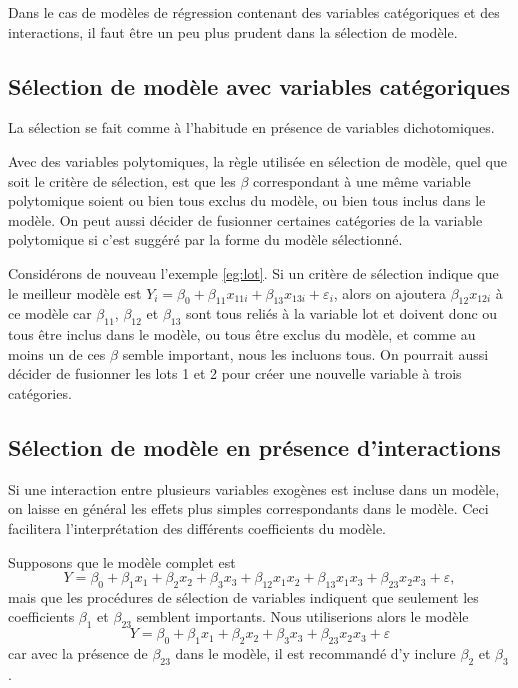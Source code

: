 Dans le cas de modèles de régression contenant des variables catégoriques et des interactions, il faut être un peu plus prudent dans la sélection de modèle.

\subsection{Sélection de modèle avec variables catégoriques}

La sélection se fait comme à l'habitude en présence de variables dichotomiques.

Avec des variables polytomiques, la règle utilisée en sélection de modèle, quel que soit le
critère de sélection, est que les $\beta$ correspondant à une m\^eme variable polytomique soient ou bien tous exclus du modèle, ou bien tous inclus dans le modèle. On peut aussi décider de fusionner certaines catégories de la variable polytomique si c'est suggéré par la forme du modèle sélectionné.

\begin{exemple}
Considérons de nouveau l'exemple \ref{eg:lot}. Si un critère de sélection indique que le meilleur modèle est $Y_i=\beta_0+\beta_{11}x_{11i}+\beta_{13}x_{13i}+\varepsilon_i$, alors on ajoutera $\beta_{12}x_{12i}$ à ce modèle car $\beta_{11}$, $\beta_{12}$ et $\beta_{13}$ sont tous reliés à la variable \og lot \fg et doivent donc ou tous \^etre inclus dans le modèle, ou tous \^etre exclus du modèle, et comme au moins un
de ces $\beta$ semble important, nous les incluons tous. On pourrait aussi décider de fusionner les lots 1 et 2 pour créer une nouvelle variable à trois catégories.
\end{exemple}




\subsection{Sélection de modèle en présence d'interactions}

Si une interaction entre plusieurs variables exogènes est incluse
dans un modèle, on laisse en général les effets plus simples
correspondants dans le modèle. Ceci facilitera l'interprétation des différents coefficients du modèle.

\begin{exemple}
Supposons que le modèle complet est
$$Y=\beta_0+\beta_1x_{1}+\beta_2x_{2}+\beta_3x_{3}+
\beta_{12}x_{1}x_{2}+\beta_{13}x_{1}x_{3}+\beta_{23}x_{2}x_{3}+\varepsilon,$$
mais que les procédures de sélection de variables indiquent que seulement les coefficients $\beta_1$ et $\beta_{23}$
semblent importants.
Nous utiliserions alors le modèle
$$Y=\beta_0+\beta_1x_{1}+\beta_2x_{2}+\beta_3x_{3}+\beta_{23}x_{2}x_{3}+\varepsilon$$
car avec la présence de $\beta_{23}$ dans le modèle, il est
recommandé d'y inclure $\beta_2$ et $\beta_3$.
\end{exemple} 